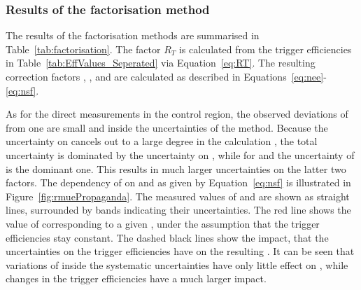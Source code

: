 \subsubsection{Results of the factorisation method}
The results of the factorisation methods are summarised in Table~\ref{tab:factorisation}. The factor $R_T$ is calculated from the trigger efficiencies in Table~\ref{tab:EffValues_Seperated} via Equation~\ref{eq:RT}. The resulting correction factors \Rsfof, \Reeof, and \Rmmof are calculated as described in Equations~\ref{eq:nee}-\ref{eq:nsf}.  

As for the direct measurements in the control region, the observed deviations of \Rsfof from one are small and inside the uncertainties of the method. Because the uncertainty on \rmue cancels out to a large degree in the calculation \Rsfof, the total uncertainty is dominated by the uncertainty on \RT, while for \Reeof and \Rmmof the uncertainty of \rmue is the dominant one. This results in much larger uncertainties on the latter two factors. The dependency of \Rsfof on \rmue and \RT as given by Equation~\ref{eq:nsf} is illustrated in Figure~\ref{fig:rmuePropaganda}. The measured values of \rmue and \Rsfof are shown as straight lines, surrounded by bands indicating their uncertainties. The red line shows the value of \Rsfof corresponding to a given \rmue, under the assumption that the trigger efficiencies stay constant. The dashed black lines show the impact, that the uncertainties on the trigger efficiencies have on the resulting \Rsfof. It can be seen that variations of \rmue inside the systematic uncertainties have only little effect on \Rsfof, while changes in the trigger efficiencies have a much larger impact. 



